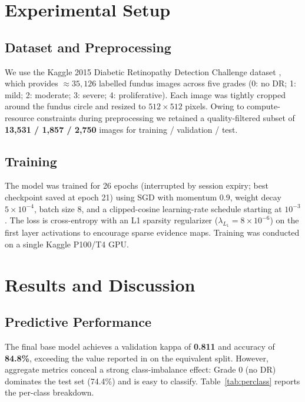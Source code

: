\documentclass[conference]{IEEEtran}
\begin{document}
\section{Experimental Setup}

\subsection{Dataset and Preprocessing}
We use the Kaggle 2015 Diabetic Retinopathy Detection Challenge dataset \cite{kaggleDR2015}, which provides $\approx 35{,}126$ labelled fundus images across five grades (0: no DR; 1: mild; 2: moderate; 3: severe; 4: proliferative). Each image was tightly cropped around the fundus circle and resized to $512\times512$ pixels. Owing to compute-resource constraints during preprocessing we retained a quality-filtered subset of \textbf{13{,}531 / 1{,}857 / 2{,}750} images for training / validation / test.

\subsection{Training}
The model was trained for 26 epochs (interrupted by session expiry; best checkpoint saved at epoch 21) using SGD with momentum $0.9$, weight decay $5{\times}10^{-4}$, batch size $8$, and a clipped-cosine learning-rate schedule starting at $10^{-3}$. The loss is cross-entropy with an L1 sparsity regularizer ($\lambda_{L_1}{=}8{\times}10^{-6}$) on the first layer activations to encourage sparse evidence maps. Training was conducted on a single Kaggle P100/T4 GPU.

\section{Results and Discussion}

\subsection{Predictive Performance}
The final base model achieves a validation kappa of \textbf{0.811} and accuracy of \textbf{84.8\%}, exceeding the value reported in \cite{djoumessi2025hybrid} on the equivalent split. However, aggregate metrics conceal a strong class-imbalance effect: Grade 0 (no DR) dominates the test set (74.4\%) and is easy to classify. Table~\ref{tab:perclass} reports the per-class breakdown.
\end{document}
